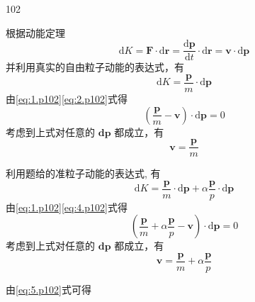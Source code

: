 \begin{solution}{102}
    \begin{subsolution}
        根据动能定理
        \begin{equation}
            \mathrm{d} K = \boldsymbol {F} \cdot \mathrm{d} \boldsymbol {r} = \frac {\mathrm{d} \boldsymbol {p}}{\mathrm{d} t} \cdot \mathrm{d} \boldsymbol {r} = \boldsymbol {v} \cdot \mathrm{d} \boldsymbol {p}
            \label{eq:1.p102}
        \end{equation}
        并利用真实的自由粒子动能的表达式，有
        \begin{equation}
            \mathrm{d} K = \frac {\boldsymbol {p}}{m} \cdot \mathrm{d} \boldsymbol {p}
            \label{eq:2.p102}
        \end{equation}
        由\eqref{eq:1.p102}\eqref{eq:2.p102}式得
        \begin{equation*}
            \left(\frac {\boldsymbol {p}}{m} - \boldsymbol {v}\right) \cdot \mathrm{d} \boldsymbol {p} = 0
        \end{equation*}
        考虑到上式对任意的 $\mathbf{dp}$ 都成立，有
        \begin{equation}
            \boldsymbol {v} = \frac {\boldsymbol {p}}{m}
            \label{eq:3.p102}
        \end{equation}
    \end{subsolution}
    \begin{subsolution}
        利用题给的准粒子动能的表达式, 有
        \begin{equation}
            \mathrm{d} K = \frac {\boldsymbol {p}}{m} \cdot \mathrm{d} \boldsymbol {p} + \alpha \frac {\boldsymbol {p}}{p} \cdot \mathrm{d} \boldsymbol {p}
            \label{eq:4.p102}
        \end{equation}
        由\eqref{eq:1.p102}\eqref{eq:4.p102}式得
        \begin{equation*}
            \left(\frac {\boldsymbol {p}}{m} + \alpha \frac {\boldsymbol {p}}{p} - \boldsymbol {v}\right) \cdot \mathrm{d} \boldsymbol {p} = 0
        \end{equation*}
        考虑到上式对任意的 $\mathbf{dp}$ 都成立，有
        \begin{equation}
            \boldsymbol {v} = \frac {\boldsymbol {p}}{m} + \alpha \frac {\boldsymbol {p}}{p}
            \label{eq:5.p102}
        \end{equation}
    \end{subsolution}
    \begin{subsolution}
        由\eqref{eq:5.p102}式可得

\end{subsolution}
\end{solution}
